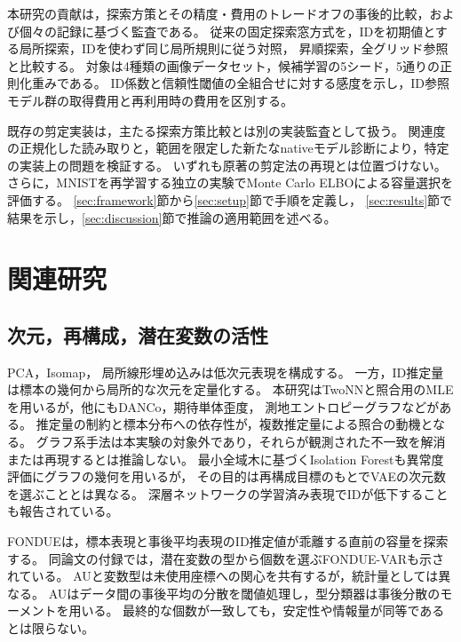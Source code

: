 \documentclass[11pt,a4paper]{ltjsarticle}
\begin{document}
本研究の貢献は，探索方策とその精度・費用のトレードオフの事後的比較，および個々の記録に基づく監査である。
従来の固定探索窓方式を，IDを初期値とする局所探索，IDを使わず同じ局所規則に従う対照，
昇順探索，全グリッド参照と比較する。
対象は4種類の画像データセット，候補学習の5シード，5通りの正則化重みである。
ID係数と信頼性閾値の全組合せに対する感度を示し，ID参照モデル群の取得費用と再利用時の費用を区別する。

既存の剪定実装は，主たる探索方策比較とは別の実装監査として扱う。
関連度の正規化した読み取りと，範囲を限定した新たなnativeモデル診断により，特定の実装上の問題を検証する。
いずれも原著の剪定法の再現とは位置づけない。
さらに，MNISTを再学習する独立の実験でMonte Carlo ELBOによる容量選択を評価する。
\ref{sec:framework}節から\ref{sec:setup}節で手順を定義し，
\ref{sec:results}節で結果を示し，\ref{sec:discussion}節で推論の適用範囲を述べる。

\section{関連研究}\label{sec:related}

\subsection{次元，再構成，潜在変数の活性}
PCA\cite{tippingbishop1999ppca}，Isomap\cite{tenenbaum2000isomap}，
局所線形埋め込み\cite{roweis2000lle}は低次元表現を構成する。
一方，ID推定量は標本の幾何から局所的な次元を定量化する。
本研究はTwoNNと照合用のMLEを用いるが，他にもDANCo，期待単体歪度，
測地エントロピーグラフなどがある\cite{ceruti2014danco,johnsson2015ess,costa2004geodesic}。
推定量の制約と標本分布への依存性が，複数推定量による照合の動機となる\cite{camastra2016intrinsic,allegra2020data}。
グラフ系手法は本実験の対象外であり，それらが観測された不一致を解消または再現するとは推論しない。
最小全域木に基づくIsolation Forestも異常度評価にグラフの幾何を用いる\cite{galka2022isolation}が，
その目的は再構成目標のもとでVAEの次元数を選ぶこととは異なる。
深層ネットワークの学習済み表現でIDが低下することも報告されている\cite{ansuini2019intrinsic,pope2021intrinsic}。

FONDUE\cite{bonheme2022fondue}は，標本表現と事後平均表現のID推定値が乖離する直前の容量を探索する。
同論文の付録では，潜在変数の型から個数を選ぶFONDUE-VARも示されている。
AUと変数型は未使用座標への関心を共有するが，統計量としては異なる。
AUはデータ間の事後平均の分散を閾値処理し，型分類器は事後分散のモーメントを用いる\cite{bonheme2023active}。
最終的な個数が一致しても，安定性や情報量が同等であるとは限らない。
\end{document}

